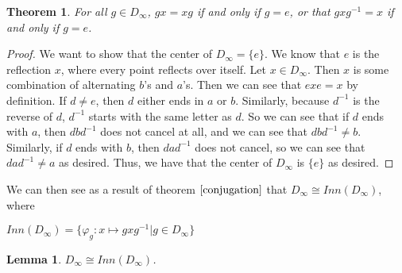 \documentclass{article}
\newtheorem{theorem}{Theorem}
\newtheorem{lemma}{Lemma}
\theoremstyle{definition}
\begin{document}
\begin{theorem}\label{conjugation}
    For all $g \in D_\infty$, $gx=xg$ if and only if $g = e$, or that $gxg^{-1} = x$ if and only if $g = e$.
\end{theorem}

\begin{proof}
    We want to show that the center of $D_\infty = \{e\}$. We know that $e$ is the reflection $x$, where every point reflects over itself. Let $x \in D_\infty$. Then $x$ is some combination of alternating $b$'s and $a$'s. Then we can see that $exe = x$ by definition. If $d \neq e$, then $d$ either ends in $a$ or $b$. Similarly, because $d^{-1}$ is the reverse of $d$, $d^{-1}$ starts with the same letter as $d$. So we can see that if $d$ ends with $a$, then $dbd^{-1}$ does not cancel at all, and we can see that $dbd^{-1} \neq b$. Similarly, if $d$ ends with $b$, then $dad^{-1}$ does not cancel, so we can see that $dad^{-1} \neq a$ as desired. Thus, we have that the center of $D_\infty$ is $\{e\}$ as desired.
\end{proof}

\noindent We can then see as a result of theorem $\ref{conjugation}$ that $D_\infty \cong Inn(D_\infty)$, where
\begin{center}
    $Inn(D_\infty) = \{\varphi_g: x \mapsto gxg^{-1} | g \in D_\infty\}$
\end{center}

\begin{center}
\end{center}

\begin{lemma}\label{conj}
    $D_\infty \cong Inn(D_\infty)$.
\end{lemma}
\end{document}
